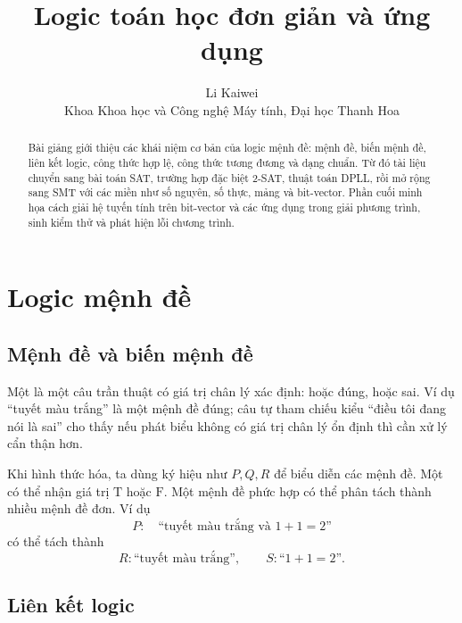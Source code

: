 \documentclass[11pt]{article}
\title{Logic toán học đơn giản và ứng dụng}
\author{Li Kaiwei\\Khoa Khoa học và Công nghệ Máy tính, Đại học Thanh Hoa}
\date{}
\newcommand{\True}{\mathrm{T}}
\newcommand{\False}{\mathrm{F}}
\begin{document}
\maketitle


\begin{abstract}
Bài giảng giới thiệu các khái niệm cơ bản của logic mệnh đề: mệnh đề, biến
mệnh đề, liên kết logic, công thức hợp lệ, công thức tương đương và dạng
chuẩn. Từ đó tài liệu chuyển sang bài toán SAT, trường hợp đặc biệt 2-SAT,
thuật toán DPLL, rồi mở rộng sang SMT với các miền như số nguyên, số thực,
mảng và bit-vector. Phần cuối minh họa cách giải hệ tuyến tính trên
bit-vector và các ứng dụng trong giải phương trình, sinh kiểm thử và phát
hiện lỗi chương trình.
\end{abstract}

\tableofcontents

\section{Logic mệnh đề}

\subsection{Mệnh đề và biến mệnh đề}

Một  là một câu trần thuật có giá trị chân lý xác định: hoặc
đúng, hoặc sai. Ví dụ ``tuyết màu trắng'' là một mệnh đề đúng; câu tự tham
chiếu kiểu ``điều tôi đang nói là sai'' cho thấy nếu phát biểu không có giá
trị chân lý ổn định thì cần xử lý cẩn thận hơn.

Khi hình thức hóa, ta dùng ký hiệu như \(P,Q,R\) để biểu diễn các mệnh đề.
Một  có thể nhận giá trị \(\True\) hoặc \(\False\). Một
mệnh đề phức hợp có thể phân tách thành nhiều mệnh đề đơn. Ví dụ
\[
  P:\quad \text{``tuyết màu trắng và }1+1=2\text{''}
\]
có thể tách thành
\[
  R:\text{``tuyết màu trắng''},\qquad
  S:\text{``}1+1=2\text{''}.
\]

\subsection{Liên kết logic}
\end{document}
